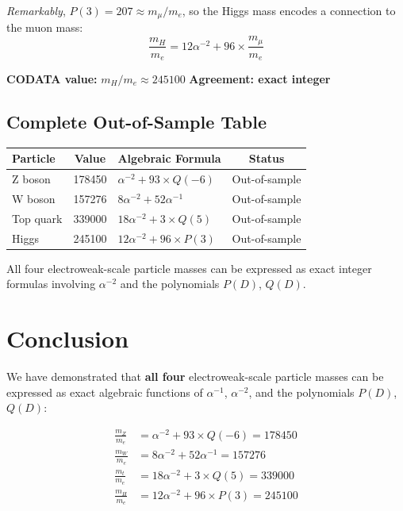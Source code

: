 \documentclass[11pt,a4paper]{article}
\begin{document}
\textit{Remarkably}, $P(3) = 207 \approx m_\mu/m_e$, so the Higgs mass encodes a connection to the muon mass:
\begin{equation}
\frac{m_H}{m_e} = 12\alpha^{-2} + 96 \times \frac{m_\mu}{m_e}
\end{equation}

\textbf{CODATA value:} $m_H/m_e \approx 245100$ \quad \textbf{Agreement: exact integer}

\subsection{Complete Out-of-Sample Table}

\begin{center}
\begin{tabular}{|l|c|l|c|}
\hline
\textbf{Particle} & \textbf{Value} & \textbf{Algebraic Formula} & \textbf{Status} \\
\hline
Z boson & 178450 & $\alpha^{-2} + 93 \times Q(-6)$ & Out-of-sample \\
W boson & 157276 & $8\alpha^{-2} + 52\alpha^{-1}$ & Out-of-sample \\
Top quark & 339000 & $18\alpha^{-2} + 3 \times Q(5)$ & Out-of-sample \\
Higgs & 245100 & $12\alpha^{-2} + 96 \times P(3)$ & Out-of-sample \\
\hline
\end{tabular}
\end{center}

All four electroweak-scale particle masses can be expressed as exact integer formulas involving $\alpha^{-2}$ and the polynomials $P(D)$, $Q(D)$.

\section{Conclusion}

We have demonstrated that \textbf{all four} electroweak-scale particle masses can be expressed as exact algebraic functions of $\alpha^{-1}$, $\alpha^{-2}$, and the polynomials $P(D)$, $Q(D)$:

\begin{align}
\frac{m_Z}{m_e} &= \alpha^{-2} + 93 \times Q(-6) = 178450 \\
\frac{m_W}{m_e} &= 8\alpha^{-2} + 52\alpha^{-1} = 157276 \\
\frac{m_t}{m_e} &= 18\alpha^{-2} + 3 \times Q(5) = 339000 \\
\frac{m_H}{m_e} &= 12\alpha^{-2} + 96 \times P(3) = 245100
\end{align}
\end{document}
